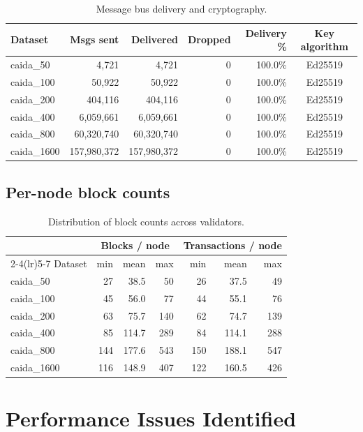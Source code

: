 \documentclass[10pt,a4paper]{article}
\begin{document}
\begin{table}[h]
\centering
\caption{Message bus delivery and cryptography.}
\small
\begin{tabular}{lrrrrc}
\toprule
Dataset & Msgs sent & Delivered & Dropped & Delivery \% & Key algorithm \\
\midrule

caida\_50 & 4,721 & 4,721 & 0 & 100.0\% & Ed25519 \\
caida\_100 & 50,922 & 50,922 & 0 & 100.0\% & Ed25519 \\
caida\_200 & 404,116 & 404,116 & 0 & 100.0\% & Ed25519 \\
caida\_400 & 6,059,661 & 6,059,661 & 0 & 100.0\% & Ed25519 \\
caida\_800 & 60,320,740 & 60,320,740 & 0 & 100.0\% & Ed25519 \\
caida\_1600 & 157,980,372 & 157,980,372 & 0 & 100.0\% & Ed25519 \\
\bottomrule
\end{tabular}
\end{table}

\subsection{Per-node block counts}

\begin{table}[h]
\centering
\caption{Distribution of block counts across validators.}
\begin{tabular}{lrrrrrr}
\toprule
 & \multicolumn{3}{c}{Blocks / node} & \multicolumn{3}{c}{Transactions / node} \\
\cmidrule(lr){2-4}\cmidrule(lr){5-7}
Dataset & min & mean & max & min & mean & max \\
\midrule

caida\_50 & 27 & 38.5 & 50 & 26 & 37.5 & 49 \\
caida\_100 & 45 & 56.0 & 77 & 44 & 55.1 & 76 \\
caida\_200 & 63 & 75.7 & 140 & 62 & 74.7 & 139 \\
caida\_400 & 85 & 114.7 & 289 & 84 & 114.1 & 288 \\
caida\_800 & 144 & 177.6 & 543 & 150 & 188.1 & 547 \\
caida\_1600 & 116 & 148.9 & 407 & 122 & 160.5 & 426 \\
\bottomrule
\end{tabular}
\end{table}

\newpage
\section{Performance Issues Identified}
\label{sec:issues}
\end{document}
